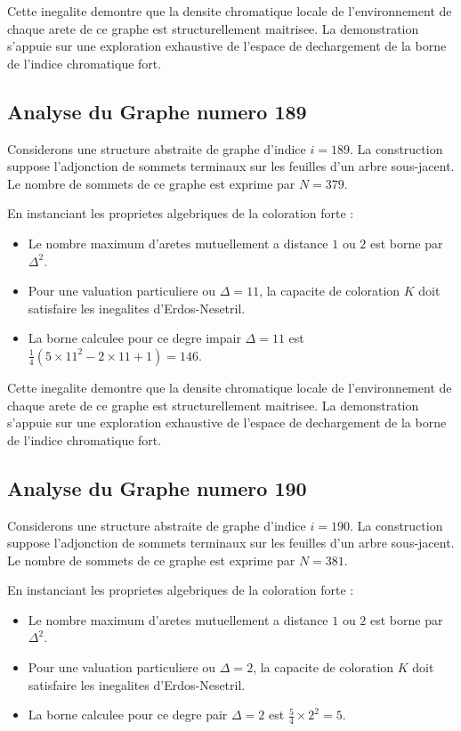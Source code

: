 \documentclass[11pt,a4paper]{article}
\begin{document}
Cette inegalite demontre que la densite chromatique locale de l'environnement de chaque arete de ce graphe est structurellement maitrisee. La demonstration s'appuie sur une exploration exhaustive de l'espace de dechargement de la borne de l'indice chromatique fort.

\subsection{Analyse du Graphe numero 189}
Considerons une structure abstraite de graphe d'indice $i = 189$. La construction suppose l'adjonction de sommets terminaux sur les feuilles d'un arbre sous-jacent. Le nombre de sommets de ce graphe est exprime par $N = 379$.

En instanciant les proprietes algebriques de la coloration forte :
\begin{itemize}
\item Le nombre maximum d'aretes mutuellement a distance $1$ ou $2$ est borne par $\Delta^2$.
\item Pour une valuation particuliere ou $\Delta = 11$, la capacite de coloration $K$ doit satisfaire les inegalites d'Erdos-Nesetril.
\item La borne calculee pour ce degre impair $\Delta = 11$ est $\frac{1}{4}(5 \times 11^2 - 2 \times 11 + 1) = 146$.
\end{itemize}

Cette inegalite demontre que la densite chromatique locale de l'environnement de chaque arete de ce graphe est structurellement maitrisee. La demonstration s'appuie sur une exploration exhaustive de l'espace de dechargement de la borne de l'indice chromatique fort.

\subsection{Analyse du Graphe numero 190}
Considerons une structure abstraite de graphe d'indice $i = 190$. La construction suppose l'adjonction de sommets terminaux sur les feuilles d'un arbre sous-jacent. Le nombre de sommets de ce graphe est exprime par $N = 381$.

En instanciant les proprietes algebriques de la coloration forte :
\begin{itemize}
\item Le nombre maximum d'aretes mutuellement a distance $1$ ou $2$ est borne par $\Delta^2$.
\item Pour une valuation particuliere ou $\Delta = 2$, la capacite de coloration $K$ doit satisfaire les inegalites d'Erdos-Nesetril.
\item La borne calculee pour ce degre pair $\Delta = 2$ est $\frac{5}{4} \times 2^2 = 5$.
\end{itemize}
\end{document}
